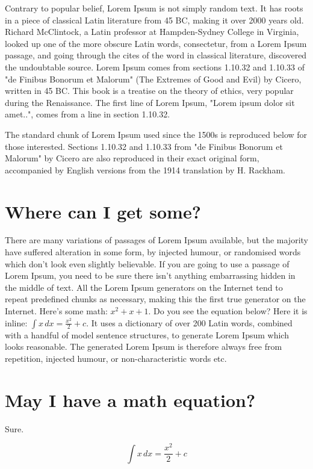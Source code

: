 Contrary to popular belief, Lorem Ipsum is not simply random text. It has roots in a piece of classical Latin literature from 45 BC, making it over 2000 years old. Richard McClintock, a Latin professor at Hampden-Sydney College in Virginia, looked up one of the more obscure Latin words, consectetur, from a Lorem Ipsum passage, and going through the cites of the word in classical literature, discovered the undoubtable source. Lorem Ipsum comes from sections 1.10.32 and 1.10.33 of "de Finibus Bonorum et Malorum" (The Extremes of Good and Evil) by Cicero, written in 45 BC. This book is a treatise on the theory of ethics, very popular during the Renaissance. The first line of Lorem Ipsum, "Lorem ipsum dolor sit amet..", comes from a line in section 1.10.32.

The standard chunk of Lorem Ipsum used since the 1500s is reproduced below for those interested. Sections 1.10.32 and 1.10.33 from "de Finibus Bonorum et Malorum" by Cicero are also reproduced in their exact original form, accompanied by English versions from the 1914 translation by H. Rackham.

\section{Where can I get some?}

There are many variations of passages of Lorem Ipsum available, but the majority have suffered alteration in some form, by injected humour, or randomised words which don't look even slightly believable. If you are going to use a passage of Lorem Ipsum, you need to be sure there isn't anything embarrassing hidden in the middle of text. All the Lorem Ipsum generators on the Internet tend to repeat predefined chunks as necessary, making this the first true generator on the Internet. Here's some math: \(x^2 + x + 1\). Do you see the equation below? Here it is inline: \(\int x \,dx = \frac{x^2}{2}+c\). It uses a dictionary of over 200 Latin words, combined with a handful of model sentence structures, to generate Lorem Ipsum which looks reasonable. The generated Lorem Ipsum is therefore always free from repetition, injected humour, or non-characteristic words etc.

\section{May I have a math equation?}

Sure. 

\[
\int x \,dx = \frac{x^2}{2}+c
\]

